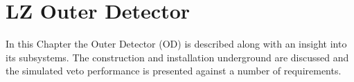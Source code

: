 \chapter{LZ Outer Detector}
\label{chapter:lz_outer_detector}
\par
In this Chapter the Outer Detector (OD) is described along with an insight into its subsystems.
The construction and installation underground are discussed and the simulated veto performance is presented against a number of requirements.







